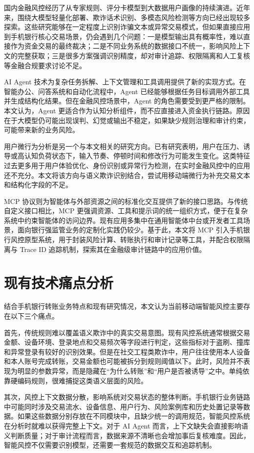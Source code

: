 \documentclass{xduugthesis}
\begin{document}
国内金融风控经历了从专家规则、评分卡模型到大数据用户画像的持续演进。近年来，围绕大模型轻量化部署、欺诈话术识别、多模态风险检测等方向已经出现较多探索\cite{nie2025multimodal}。这些研究能够在一定程度上识别诈骗文本或异常交易模式，但如果直接应用到手机银行核心交易场景，仍会遇到几个问题：一是模型输出具有概率性，难以直接作为资金交易的最终裁决；二是不同业务系统的数据接口不统一，影响风险上下文的完整获取；三是很多方案强调识别精度，却对审计追踪、权限隔离和人工复核等金融合规要求讨论不足。

AI Agent 技术为复杂任务拆解、上下文管理和工具调用提供了新的实现方式。在智能办公、问答系统和自动化流程中，Agent 已经能够根据任务目标调用外部工具并生成结构化结果。但在金融风控场景中，Agent 的角色需要受到更严格的限制。本文认为，Agent 更适合作为认知分析组件，而不应直接进入资金执行链路。原因在于大模型仍可能出现误判、幻觉或输出不稳定，如果缺少规则治理和审计约束，可能带来新的业务风险。

用户微行为分析是另一个与本文相关的研究方向。已有研究表明，用户在压力、诱导或高认知负荷状态下，输入节奏、停顿时间和修改行为可能发生变化。这类特征过去更多用于用户体验优化、身份识别或异常行为检测，在实时金融风控中的应用还不充分。本文将该方向与语义欺诈识别结合，尝试用移动端微行为补充交易文本和结构化字段的不足。

MCP 协议则为智能体与外部资源之间的标准化交互提供了新的接口思路。与传统自定义接口相比，MCP 更强调资源、工具和提示词的统一组织方式，便于在复杂系统中约束智能体的访问边界。现有应用多集中在通用智能体中台或开发者工具场景，面向银行强监管业务的定制化实践仍较少。基于此，本文将 MCP 引入手机银行风控原型系统，用于封装风险计算、转账执行和审计记录等工具，并配合权限隔离与 Trace ID 追踪机制，探索其在金融级审计链路中的应用价值。

\section{现有技术痛点分析}

结合手机银行转账业务特点和现有研究情况，本文认为当前移动端智能风控主要存在以下三个痛点。

首先，传统规则难以覆盖语义欺诈中的真实交易意图。现有风控系统通常根据交易金额、设备环境、登录地点和交易频次等字段进行判定，这些指标对于盗刷、撞库和异常登录有较好的识别效果。但是在社交工程类欺诈中，用户往往使用本人设备和本人账号完成转账，交易金额也可能被拆分到规则阈值以下。此时，风险并不表现为明显的参数异常，而是隐藏在“为什么转账”和“用户是否被诱导”之中。单纯依靠硬编码规则，很难捕捉这类语义层面的风险\cite{nicolaou2025llm}。

其次，风控上下文数据分散，影响系统对交易状态的整体判断。手机银行业务链路中可能同时涉及交易流水、设备信息、用户行为、风险案例库和历史处置记录等数据。如果这些数据分别存放在不同模块中，且缺少统一的调用规范，智能风控系统在分析时就难以获得完整上下文。对于 AI Agent 而言，上下文缺失会直接影响语义判断质量；对于审计流程而言，数据来源不清晰也会增加事后复核难度。因此，智能风控不仅需要识别模型，还需要一套规范的数据交互和追踪机制。
\end{document}
